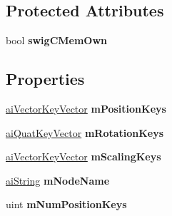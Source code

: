 \subsection*{Protected Attributes}
\begin{DoxyCompactItemize}
\item 
\hypertarget{structai_node_anim_ac7296615d32e7ee0bec53917c49f8c93}{bool {\bfseries swig\+C\+Mem\+Own}}\label{structai_node_anim_ac7296615d32e7ee0bec53917c49f8c93}

\end{DoxyCompactItemize}
\subsection*{Properties}
\begin{DoxyCompactItemize}
\item 
\hypertarget{structai_node_anim_a9140eb75831035cd4f8b64bafe8427a1}{\hyperlink{classai_vector_key_vector}{ai\+Vector\+Key\+Vector} {\bfseries m\+Position\+Keys}}\label{structai_node_anim_a9140eb75831035cd4f8b64bafe8427a1}

\item 
\hypertarget{structai_node_anim_a91e12d6089107597de7523d08eb3ab00}{\hyperlink{classai_quat_key_vector}{ai\+Quat\+Key\+Vector} {\bfseries m\+Rotation\+Keys}}\label{structai_node_anim_a91e12d6089107597de7523d08eb3ab00}

\item 
\hypertarget{structai_node_anim_ac0a8b90bf4a0b710fe7b6c146781cfed}{\hyperlink{classai_vector_key_vector}{ai\+Vector\+Key\+Vector} {\bfseries m\+Scaling\+Keys}}\label{structai_node_anim_ac0a8b90bf4a0b710fe7b6c146781cfed}

\item 
\hypertarget{structai_node_anim_a1471759f073840f9aa7001f866b41780}{\hyperlink{structai_string}{ai\+String} {\bfseries m\+Node\+Name}}\label{structai_node_anim_a1471759f073840f9aa7001f866b41780}

\item 
\hypertarget{structai_node_anim_a3711f99d6a7ccf9b94863cfcb176e947}{uint {\bfseries m\+Num\+Position\+Keys}}\label{structai_node_anim_a3711f99d6a7ccf9b94863cfcb176e947}


\end{DoxyCompactItemize}
